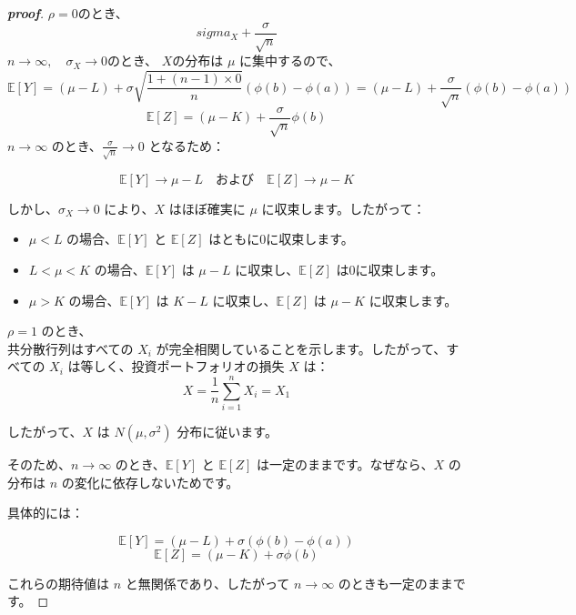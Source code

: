 \documentclass[a4paper,11pt]{jsarticle}
\begin{document}
\begin{proof}[\textbf{proof}]
$ \rho = 0 $のとき、\\
$$ sigma_X + \dfrac{\sigma}{\sqrt{n}} $$
$ n\rightarrow\infty ,\quad \sigma_X\rightarrow 0$のとき、 $ X $の分布は $ \mu $  に集中するので、\\
\[  
\mathbb{E}[Y] = (\mu - L) + \sigma\sqrt{\frac{1 + (n - 1) \times 0}{n}}(\phi(b) - \phi(a)) = (\mu - L) + \frac{\sigma}{\sqrt{n}}(\phi(b) - \phi(a))  
\] 
\[  
\mathbb{E}[Z] = (\mu - K) + \frac{\sigma}{\sqrt{n}}\phi(b)  
\]  
$n \to \infty$ のとき、$\frac{\sigma}{\sqrt{n}} \to 0$ となるため：  

\[  
\mathbb{E}[Y] \to \mu - L \quad \text{および} \quad \mathbb{E}[Z] \to \mu - K  
\]  

しかし、$\sigma_X \to 0$ により、$X$ はほぼ確実に $\mu$ に収束します。したがって：  

\begin{itemize}  
\item $\mu < L$ の場合、$\mathbb{E}[Y]$ と $\mathbb{E}[Z]$ はともに0に収束します。  
\item $L < \mu < K$ の場合、$\mathbb{E}[Y]$ は $\mu - L$ に収束し、$\mathbb{E}[Z]$ は0に収束します。  
\item $\mu > K$ の場合、$\mathbb{E}[Y]$ は $K - L$ に収束し、$\mathbb{E}[Z]$ は $\mu - K$ に収束します。  
\end{itemize}  

$\rho = 1$ のとき、\\
共分散行列はすべての $X_i$ が完全相関していることを示します。したがって、すべての $X_i$ は等しく、投資ポートフォリオの損失 $X$ は：\\  

\[  
X = \frac{1}{n}\sum_{i=1}^n X_i = X_1  
\]  

したがって、$X$ は $N(\mu, \sigma^2)$ 分布に従います。  

そのため、$n \to \infty$ のとき、$\mathbb{E}[Y]$ と $\mathbb{E}[Z]$ は一定のままです。なぜなら、$X$ の分布は $n$ の変化に依存しないためです。  

具体的には：  

\[  
\mathbb{E}[Y] = (\mu - L) + \sigma(\phi(b) - \phi(a))  
\]  
\[  
\mathbb{E}[Z] = (\mu - K) + \sigma\phi(b)  
\]  

これらの期待値は $n$ と無関係であり、したがって $n \to \infty$ のときも一定のままです。

\end{proof}
\end{document}
